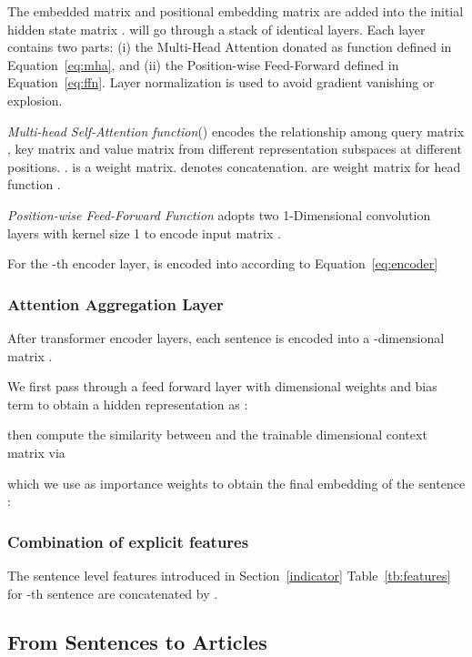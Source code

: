 \documentclass[runningheads]{llncs}
\begin{document}
The embedded matrix  and positional embedding matrix  are added into the initial hidden state matrix .
 will go through a stack of  identical layers. Each layer contains two parts: (i) the Multi-Head Attention donated as function  defined in Equation~\ref{eq:mha}, and (ii) the Position-wise Feed-Forward  defined in Equation~\ref{eq:ffn}. Layer normalization is used to avoid gradient vanishing or explosion.

\emph{Multi-head Self-Attention function}() \cite{vaswani2017attention}  encodes the relationship among query matrix ,  key matrix  and value matrix  from different representation subspaces at different positions. .  is a  weight matrix.  denotes concatenation.  are  weight matrix for head function .  




\emph{Position-wise Feed-Forward Function}  \cite{vaswani2017attention}  adopts two 1-Dimensional convolution layers with kernel size 1 to encode input matrix .


For the -th encoder layer,  is encoded into   according to Equation~\ref{eq:encoder}


\subsubsection{Attention Aggregation Layer}



After  transformer encoder layers, each sentence  is encoded into a -dimensional  matrix .


We first pass  through a feed forward layer with  dimensional weights  and
bias term  to obtain a hidden representation as :

then compute the similarity between  and
the trainable  dimensional context matrix  via

which we use as importance weights to obtain the final embedding of the sentence :




\subsubsection{Combination of explicit features}
The sentence level features  introduced in Section~\ref{indicator} Table~\ref{tb:features} for -th sentence are concatenated by  .

  \subsection{From Sentences to Articles}
\end{document}
